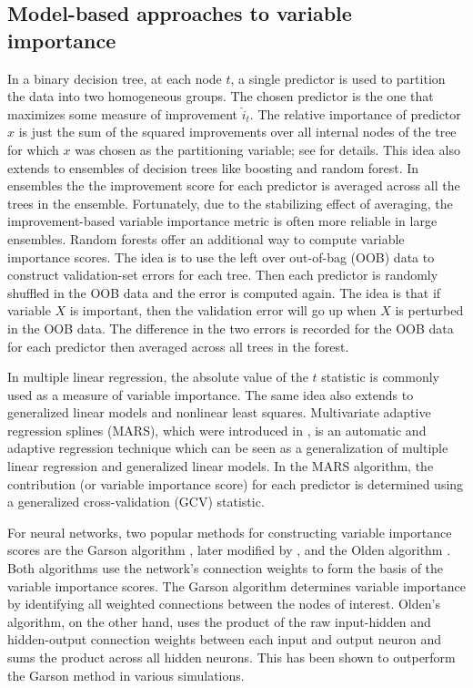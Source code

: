 \documentclass[12pt]{article}
\begin{document}
\subsection{Model-based approaches to variable importance}

In a binary decision tree, at each node $t$, a single predictor is used to partition the data into two homogeneous groups. The chosen predictor is the one that maximizes some measure of improvement $\widehat{i}_t$. The relative importance of predictor $x$ is just the sum of the squared improvements over all internal nodes of the tree for which $x$ was chosen as the partitioning variable; see \citet{classification-breiman-1984} for details. This idea also extends to ensembles of decision trees like boosting and random forest. In ensembles the the improvement score for each predictor is averaged across all the trees in the ensemble. Fortunately, due to the stabilizing effect of averaging, the improvement-based variable importance metric is often more reliable in large ensembles. Random forests offer an additional way to compute variable importance scores. The idea is to use the left over out-of-bag (OOB) data to construct validation-set errors for each tree. Then each predictor is randomly shuffled in the OOB data and the error is computed again. The idea is that if variable $X$ is important, then the validation error will go up when $X$ is perturbed in the OOB data. The difference in the two errors is recorded for the OOB data for each predictor then averaged across all trees in the forest.

In multiple linear regression, the absolute value of the $t$ statistic is commonly used as a measure of variable importance. The same idea also extends to generalized linear models and nonlinear least squares. Multivariate adaptive regression splines (MARS), which were introduced in \citet{friedman-1991-mars}, is an automatic and adaptive regression technique which can be seen as a generalization of multiple linear regression and generalized linear models. In the MARS algorithm, the contribution (or variable importance score) for each predictor is determined using a generalized cross-validation (GCV) statistic.

For neural networks, two popular methods for constructing variable importance scores are the Garson algorithm \citep{interpreting-garson-1991}, later modified by \citet{back-goh-1995}, and the Olden algorithm \citep{accurate-olden-2004}. Both algorithms use the network's connection weights to form the basis of the variable importance scores. The Garson algorithm determines variable importance by identifying all weighted connections between the nodes of interest. Olden's algorithm, on the other hand, uses the product of the raw input-hidden and hidden-output connection weights between each input and output neuron and sums the product across all hidden neurons. This has been shown to outperform the Garson method in various simulations.
\end{document}
